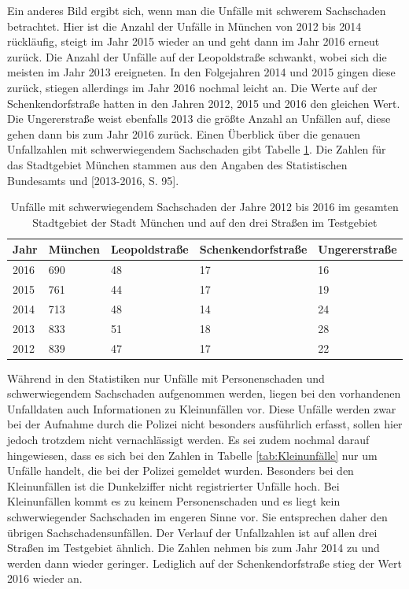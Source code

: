 Ein anderes Bild ergibt sich, wenn man die Unfälle mit schwerem Sachschaden betrachtet. Hier ist die Anzahl der Unfälle in München von 2012 bis 2014 rückläufig, steigt im Jahr 2015 wieder an und geht dann im Jahr 2016 erneut zurück. Die Anzahl der Unfälle auf der Leopoldstraße schwankt, wobei sich die meisten im Jahr 2013 ereigneten. In den Folgejahren 2014 und 2015 gingen diese zurück, stiegen allerdings im Jahr 2016 nochmal leicht an. Die Werte auf der Schenkendorfstraße hatten in den Jahren 2012, 2015 und 2016 den gleichen Wert. Die Ungererstraße weist ebenfalls 2013 die größte Anzahl an Unfällen auf, diese gehen dann bis zum Jahr 2016 zurück. Einen Überblick über die genauen Unfallzahlen mit schwerwiegendem Sachschaden gibt Tabelle \ref{tab:Unfälle München schwerw. Sachschaden}. Die Zahlen für das Stadtgebiet München stammen aus den Angaben des Statistischen Bundesamts \parencite[S. 98]{StatistischesBundesamt.2017} und [2013-2016, S. 95].

\begin{table}[htpb]
	\scriptsize
	\caption[Unfälle mit schwerwiegendem Sachschaden]{Unfälle mit schwerwiegendem Sachschaden der Jahre 2012 bis 2016 im gesamten Stadtgebiet der Stadt München und auf den drei Straßen im Testgebiet}\label{tab:Unfälle München schwerw. Sachschaden}
	\centering
	\begin{tabular}{l l l l p{2cm}}
		\toprule
		Jahr & München & Leopoldstraße & Schenkendorfstraße & Ungererstraße \\
		\midrule
		2016 & 690 & 48 & 17 & 16\\
		2015 & 761 & 44 & 17 & 19\\
		2014 & 713 & 48 & 14 & 24\\
		2013 & 833 & 51 & 18 & 28\\
		2012 & 839 & 47 & 17 & 22\\
		\bottomrule
	\end{tabular}
\end{table}

Während in den Statistiken nur Unfälle mit Personenschaden und schwerwiegendem Sachschaden aufgenommen werden, liegen bei den vorhandenen Unfalldaten auch Informationen zu Kleinunfällen vor. Diese Unfälle werden zwar bei der Aufnahme durch die Polizei nicht besonders ausführlich erfasst, sollen hier jedoch trotzdem nicht vernachlässigt werden. Es sei zudem nochmal darauf hingewiesen, dass es sich bei den Zahlen in Tabelle \ref{tab:Kleinunfälle} nur um Unfälle handelt, die bei der Polizei gemeldet wurden. Besonders bei den Kleinunfällen ist die Dunkelziffer nicht registrierter Unfälle hoch. Bei Kleinunfällen kommt es zu keinem Personenschaden und es liegt kein schwerwiegender Sachschaden im engeren Sinne vor. Sie entsprechen daher den übrigen Sachschadensunfällen. Der Verlauf der Unfallzahlen ist auf allen drei Straßen im Testgebiet ähnlich. Die Zahlen nehmen bis zum Jahr 2014 zu und werden dann wieder geringer. Lediglich auf der Schenkendorfstraße stieg der Wert 2016 wieder an.

